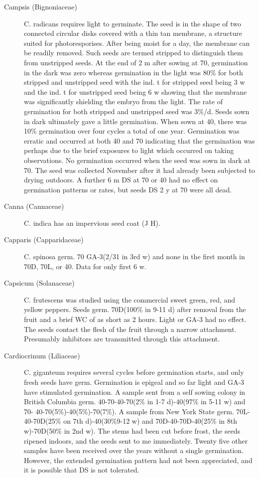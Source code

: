 \begin{description}
\item[Campsis (Bignoniaceae)] C. radicans requires light to germinate. The
seed is in the shape of two connected circular disks covered with a thin tan membrane,
a structure suited for photoresporises. After being moist for a day, the membrane can
be readily removed. Such seeds are termed stripped to distinguish them from
unstripped seeds. At the end of 2 m after sowing at 70, germination in the dark was
zero whereas germination in the light was 80\% for both stripped and unstripped seed
with the ind. t for stripped seed being 3 w and the ind. t for unstripped seed being 6 w
showing that the membrane was significantly shielding the embryo from the light. The
rate of germination for both stripped and unstripped seed was 3\%/d. Seeds sown in
dark ultimately gave a little germination. When sown at 40, there was 10\%
germination over four cycles a total of one year. Germination was erratic and
occurred at both 40 and 70 indicating that the germination was perhaps due to the
brief exposures to light which occurred on taking observations. No germination
occurred when the seed was sown in dark at 70. The seed was collected November
after it had already been subjected to drying outdoors. A further 6 m DS at 70 or 40
had no effect on germination patterns or rates, but seeds DS 2 y at 70 were all dead.
\item[Canna (Cannaceae)] C. indica has an impervious seed coat (J H).

\item[Capparis (Capparidaceae)] C. spinosa germ. 70 GA-3(2/31 in 3rd w) and
none in the first month in 70D, 70L, or 40. Data for only first 6 w.

\item[Capsicum (Solanaceae)] C. frutescens was studied using the commercial
sweet green, red, and yellow peppers. Seeds germ. 70D(100\% in 9-11 d) after
removal from the fruit and a brief WC of as short as 2 hours. Light or GA-3 had no
effect. The seeds contact the flesh of the fruit through a narrow attachment.
Presumably inhibitors are transmitted through this attachment.

\item[Cardiocrinum (Liliaceae)] C. giganteum requires several cycles before
germination starts, and only fresh seeds have germ. Germination is epigeal and so far
light and GA-3 have stimulated germination. A sample sent from a self sowing
colony in British Columbia germ. 40-70-40-70(2\% in 1-7 d)-40(97\% in 5-11 w) and 70-
40-70(5\%)-40(5\%)-70(7\%). A sample from New York State germ. 70L-40-70D(25\%
on 7th d)-40(30\%9-12 w) and 70D-40-70D-40(25\% in 8th w)-70D(50\% in 2nd w).
The stems had been cut before frost, the seeds ripened indoors, and the seeds sent to
me immediately. Twenty five other samples have been received over the years
without a single germination. However, the extended germination pattern had not
been appreciated, and it is possible that DS is not tolerated.


\end{description}
